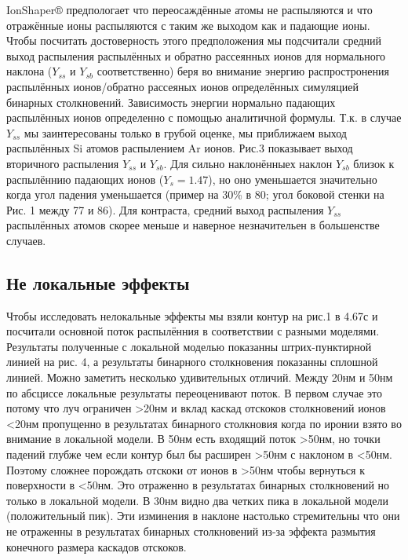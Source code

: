 \documentclass[a4paper,fontsize=12pt]{article}
\begin{document}
IonShaper® предпологает что переосаждённые атомы не распыляются и что отражённые ионы распыляются с таким же выходом как и падающие ионы. Чтобы посчитать достоверность этого предположения мы подсчитали средний выход распыления распылённых и обратно рассеянных ионов для нормального наклона ($Y_{ss}$ и $Y_{sb}$ соответственно) беря во внимание энергию распростронения распылённых ионов/обратно рассеяных ионов определённых симуляцией бинарных столкновений. Зависимость энергии нормально падающих распылённых ионов определенно с помощью аналитичной формулы. Т.к. в случае $Y_{ss}$ мы заинтересованы только в грубой оценке, мы приближаем выход распылённых Si атомов распылением Ar ионов.
Рис.3 показывает выход вторичного распыления $Y_{ss}$ и $Y_{sb}$. Для сильно наклонённыех наклон $Y_{sb}$ близок к распылённию падающих ионов
($Y_{s} = 1.47$),
но оно уменьшается значительно когда угол падения уменьшается (пример на 30\% в 80; угол боковой стенки на Рис. 1 между 77 и 86). Для контраста, средний выход распыления $Y_{ss}$ распылённых атомов скорее меньше и наверное незначительен в большенстве случаев.

\subsection{Не локальные эффекты}

Чтобы исследовать нелокальные эффекты мы взяли контур на рис.1 в 4.67с и посчитали основной поток распылённия в соответствии с разными моделями. Результаты полученные с локальной моделью показанны штрих-пунктирной линией на рис. 4, а результаты бинарного столкновения показанны сплошной линией. Можно заметить несколько удивительных отличий. Между 20нм и 50нм по абсциссе локальные результаты переоценивают поток. В первом случае это потому что луч ограничен \textgreater 20нм и вклад каскад отскоков столкновений ионов \textless 20нм пропущенно в результатах бинарного столкновия когда по иронии взято во внимание в локальной модели. В 50нм есть входящий поток \textgreater 50нм, но точки падений глубже чем если контур был бы расширен \textgreater 50нм с наклоном в \textless 50нм. Поэтому сложнее порождать отскоки от ионов в \textgreater 50нм чтобы вернуться к поверхности в \textless 50нм. Это отраженно в результатах бинарных столкновений но только в локальной модели. В 30нм видно два четких пика в локальной модели (положительный пик). Эти изминения в наклоне настолько стремительны что они не отраженны в результатах бинарных столкновений из-за эффекта размытия конечного размера каскадов отскоков.
\end{document}
